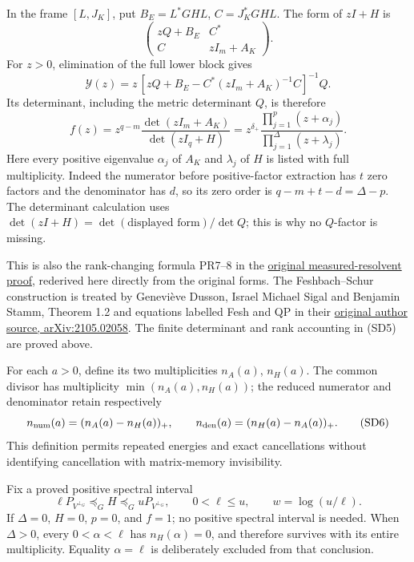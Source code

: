 \documentclass[11pt]{article}
\begin{document}
In the frame \([L,J_K]\), put \(B_E=L^*GHL\), \(C=J_K^*GHL\). The form of \(zI+H\) is \[
\begin{pmatrix}zQ+B_E&C^*\\ C&zI_m+A_K\end{pmatrix}.
\] For \(z>0\), elimination of the full lower block gives \[
\mathscr Y(z)=z\,[zQ+B_E-C^*(zI_m+A_K)^{-1}C]^{-1}Q.
\] Its determinant, including the metric determinant \(Q\), is therefore \[
f(z)=z^{q-m}\frac{\det(zI_m+A_K)}{\det(zI_q+H)}
=z^{\delta_+}
\frac{\prod_{j=1}^{p}(z+\alpha_j)}
{\prod_{j=1}^{\Delta}(z+\lambda_j)}.
\tag{SD5}
\] Here every positive eigenvalue \(\alpha_j\) of \(A_K\) and \(\lambda_j\) of \(H\) is listed with full multiplicity. Indeed the numerator before positive-factor extraction has \(t\) zero factors and the denominator has \(d\), so its zero order is \(q-m+t-d=\Delta-p\). The determinant calculation uses \(\det(zI+H)=\det(\text{displayed form})/\det Q\); this is why no \(Q\)-factor is missing.

This is also the rank-changing formula PR7--8 in the \href{https://github.com/KokunoYumeto/zeta-function-research-reader/blob/13ca9b136fcdae48df7454bd9bf99e1ef22dd03c/workbenches/splitzero-tandem/continuations/20260922-original-growth-resolvent/RECEIVED_RESOLVENT_PROOFS.md}{original measured-resolvent proof}, rederived here directly from the original forms. The Feshbach--Schur construction is treated by Geneviève Dusson, Israel Michael Sigal and Benjamin Stamm, Theorem 1.2 and equations labelled Fesh and QP in their \href{https://arxiv.org/abs/2105.02058}{original author source, arXiv:2105.02058}. The finite determinant and rank accounting in (SD5) are proved above.

For each \(a>0\), define its two multiplicities \(n_A(a)\), \(n_H(a)\). The common divisor has multiplicity \(\min(n_A(a),n_H(a))\); the reduced numerator and denominator retain respectively \[
n_{\rm num}(a)=(n_A(a)-n_H(a))_+,\qquad
n_{\rm den}(a)=(n_H(a)-n_A(a))_+.
\tag{SD6}
\] This definition permits repeated energies and exact cancellations without identifying cancellation with matrix-memory invisibility.

Fix a proved positive spectral interval \[
\ell P_{V^{\perp_G}}\preceq_G H\preceq_G uP_{V^{\perp_G}},
\qquad0<\ell\le u,\qquad w=\log(u/\ell).
\tag{SD7}
\] If \(\Delta=0\), \(H=0\), \(p=0\), and \(f=1\); no positive spectral interval is needed. When \(\Delta>0\), every \(0<\alpha<\ell\) has \(n_H(\alpha)=0\), and therefore survives with its entire multiplicity. Equality \(\alpha=\ell\) is deliberately excluded from that conclusion.
\end{document}
